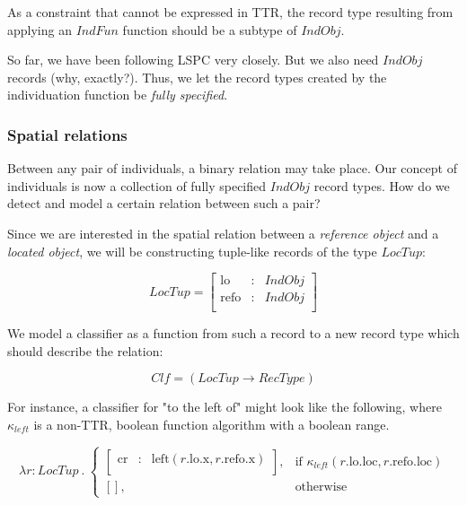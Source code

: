 \documentclass[11pt, a4paper]{article}
\begin{document}
As a constraint that cannot be expressed in TTR, the record type resulting from applying an $IndFun$ function should be a subtype of $IndObj$.

So far, we have been following LSPC very closely.
But we also need $IndObj$ records (why, exactly?).
Thus, we let the record types created by the individuation function be \textit{fully specified}.



\subsubsection{Spatial relations}

Between any pair of individuals, a binary relation may take place.
Our concept of individuals is now a collection of fully specified $IndObj$ record types.
How do we detect and model a certain relation between such a pair?

Since we are interested in the spatial relation between a \textit{reference object} and a \textit{located object}, we will be constructing tuple-like records of the type $LocTup$:

\begin{equation}\label{eq:loctup}
LocTup = \left[\begin{array}{rcl}
    \text{lo} &:& IndObj \\
    \text{refo} &:& IndObj \\
    \end{array}\right]
\end{equation}

We model a classifier as a function from such a record to a new record type which should describe the relation:

\begin{equation}\label{eq:clf}
Clf = ( LocTup \rightarrow RecType )
\end{equation}

For instance, a classifier for "to the left of" might look like the following, where $\kappa_{left}$ is a non-TTR, boolean function algorithm with a boolean range.

\begin{equation}\label{eq:leftclfdef}
\lambda r : LocTup \ .\ 
\begin{cases}
\left[\begin{array}{rcl}
    \text{cr} &:& \text{left}(r.\text{lo}.\text{x}, r.\text{refo}.\text{x}) \\
\end{array}\right],
& \text{if } \kappa_{left}(r.\text{lo}.\text{loc}, r.\text{refo}.\text{loc}) \\
[], & \text{otherwise}
\end{cases}
\end{equation}
\end{document}
